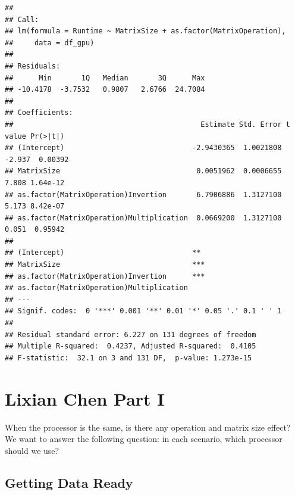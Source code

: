 \documentclass[
]{article}
\begin{document}
\begin{verbatim}
## 
## Call:
## lm(formula = Runtime ~ MatrixSize + as.factor(MatrixOperation), 
##     data = df_gpu)
## 
## Residuals:
##      Min       1Q   Median       3Q      Max 
## -10.4178  -3.7532   0.9807   2.6766  24.7084 
## 
## Coefficients:
##                                            Estimate Std. Error t value Pr(>|t|)
## (Intercept)                              -2.9430365  1.0021808  -2.937  0.00392
## MatrixSize                                0.0051962  0.0006655   7.808 1.64e-12
## as.factor(MatrixOperation)Invertion       6.7906886  1.3127100   5.173 8.42e-07
## as.factor(MatrixOperation)Multiplication  0.0669200  1.3127100   0.051  0.95942
##                                             
## (Intercept)                              ** 
## MatrixSize                               ***
## as.factor(MatrixOperation)Invertion      ***
## as.factor(MatrixOperation)Multiplication    
## ---
## Signif. codes:  0 '***' 0.001 '**' 0.01 '*' 0.05 '.' 0.1 ' ' 1
## 
## Residual standard error: 6.227 on 131 degrees of freedom
## Multiple R-squared:  0.4237, Adjusted R-squared:  0.4105 
## F-statistic:  32.1 on 3 and 131 DF,  p-value: 1.273e-15
\end{verbatim}

\hypertarget{lixian-chen-part-i}{%
\section{Lixian Chen Part I}\label{lixian-chen-part-i}}

When the processor is the same, is there any operation and matrix size
effect? We want to answer the following question: in each scenario,
which processor should we use?

\hypertarget{getting-data-ready}{%
\subsection{Getting Data Ready}\label{getting-data-ready}}
\end{document}
